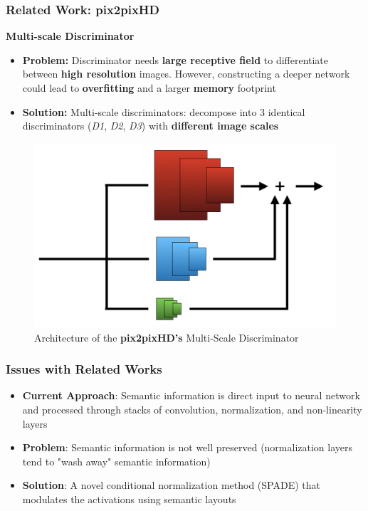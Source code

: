 \documentclass{beamer}
\begin{document}
\begin{frame}
\frametitle{Related Work: pix2pixHD}
\textbf{Multi-scale Discriminator}
\begin{itemize}
    \item \textbf{Problem:} Discriminator needs \textbf{large receptive field} to differentiate between \textbf{high resolution} images. However, constructing a deeper network could lead to \textbf{overfitting} and a larger \textbf{memory} footprint
    \item \textbf{Solution:} Multi-scale discriminators: decompose into 3 identical discriminators (\textit{D1}, \textit{D2}, \textit{D3}) with \textbf{different image scales}
\end{itemize}
\begin{figure}
\includegraphics[scale=0.17]{figures/multi_scale_discriminator.png} 
\caption{Architecture of the \textbf{pix2pixHD's} Multi-Scale Discriminator}
\end{figure}
\end{frame}

\begin{frame}
\frametitle{Issues with Related Works}
\begin{itemize}[<+->]
	\item \textbf{Current Approach}: Semantic information is direct input to neural network and processed through stacks of convolution, normalization, and non-linearity layers
	\item \textbf{Problem}: Semantic information is not well preserved (normalization layers tend to "wash away" semantic information)
	\item \textbf{Solution}: A novel conditional normalization method (SPADE) that modulates the activations using semantic layouts
\end{itemize}
\end{frame}
\end{document}
